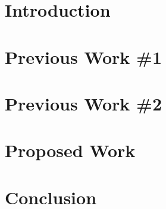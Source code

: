 \documentclass[12pt]{article}
\title{}
\author{
	\authorName\\
	\authorDepartment\\
	\authorAddress \\ %
	\authorEmail \\
}
\date{\today}
\begin{document}
	


\newpage
\tableofcontents

\newpage

\section{Introduction}


\section{Previous Work \#1}
\label{chap:previous_1}


\section{Previous Work \#2}
\label{chap:previous_2}


\section{Proposed Work}
\label{chap:proposed}


\section{Conclusion}


\newpage
\small

\end{document}
